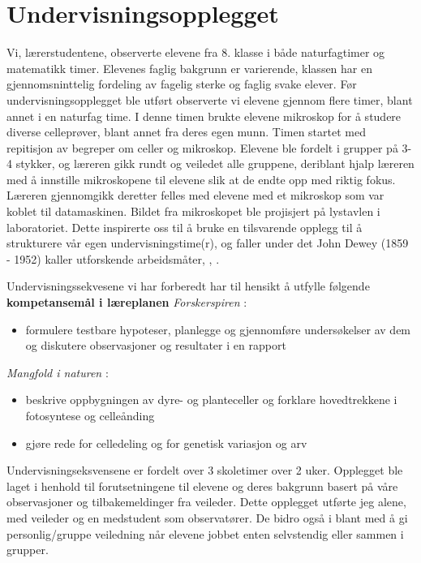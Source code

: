 \documentclass[main.tex]{subfiles}
\begin{document}
\section*{Undervisningsopplegget}
\label{sec:1}

Vi, lærerstudentene, observerte elevene fra 8. klasse i både naturfagtimer og matematikk timer. 
Elevenes faglig bakgrunn er varierende, klassen har en gjennomsninttelig fordeling av fagelig 
sterke og faglig svake elever. Før undervisningsopplegget ble utført observerte vi elevene 
gjennom flere timer, blant annet i en naturfag time. I denne timen brukte elevene mikroskop 
for å studere diverse celleprøver, blant annet fra deres egen munn. Timen startet med 
repitisjon av begreper om celler og mikroskop. Elevene ble fordelt i grupper på 3-4 stykker, 
og læreren gikk rundt og veiledet alle gruppene, deriblant hjalp læreren med å innstille 
mikroskopene til elevene slik at de endte opp med riktig fokus. Læreren gjennomgikk deretter 
felles med elevene med et mikroskop som var koblet til datamaskinen. Bildet fra mikroskopet 
ble projisjert på lystavlen i laboratoriet. Dette inspirerte oss til å bruke en tilsvarende 
opplegg til å strukturere vår egen undervisningstime(r), og faller under det John Dewey (1859 - 
1952) kaller utforskende arbeidsmåter, , .

Undervisningssekvesene vi har forberedt har til hensikt å utfylle følgende \textbf{kompetansemål 
i læreplanen}
\newline
\newline
\emph{Forskerspiren} :
\begin{itemize}
\vspace{-2mm}
\item formulere testbare hypoteser, planlegge og gjennomføre undersøkelser 
av dem og diskutere observasjoner og resultater i en rapport
\end{itemize}
\emph{Mangfold i naturen} :
\begin{itemize}
\vspace{-2mm}
\item beskrive oppbygningen av dyre- og planteceller og forklare hovedtrekkene i fotosyntese 
og celleånding
\vspace{-5mm}
\item gjøre rede for celledeling og for genetisk variasjon og arv
\end{itemize}
Undervisningseksvensene er fordelt over 3 skoletimer over 2 uker. Opplegget ble laget i henhold
til forutsetningene til elevene og deres bakgrunn basert på våre observasjoner og 
tilbakemeldinger fra veileder. Dette opplegget utførte jeg alene, med veileder og en medstudent 
som observatører. De bidro også i blant med å gi personlig/gruppe veiledning når elevene jobbet
enten selvstendig eller sammen i grupper.
\end{document}
